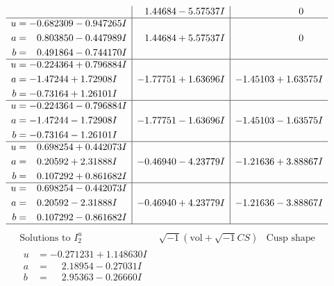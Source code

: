 \documentclass[1p]{elsarticle_modified}
\theoremstyle{definition}
\newcommand{\I}{\sqrt{-1}}
\begin{document}
$$\begin{array}{c|c|c}
 & \phantom{-}1.44684 - 5.57537 I & \phantom{-0.000000 } 0 \\ \hline\begin{aligned}
u &= -0.682309 - 0.947265 I \\
a &= \phantom{-}0.803850 - 0.447989 I \\
b &= \phantom{-}0.491864 - 0.744170 I\end{aligned}
 & \phantom{-}1.44684 + 5.57537 I & \phantom{-0.000000 } 0 \\ \hline\begin{aligned}
u &= -0.224364 + 0.796884 I \\
a &= -1.47244 + 1.72908 I \\
b &= -0.73164 + 1.26101 I\end{aligned}
 & -1.77751 + 1.63696 I & -1.45103 + 1.63575 I \\ \hline\begin{aligned}
u &= -0.224364 - 0.796884 I \\
a &= -1.47244 - 1.72908 I \\
b &= -0.73164 - 1.26101 I\end{aligned}
 & -1.77751 - 1.63696 I & -1.45103 - 1.63575 I \\ \hline\begin{aligned}
u &= \phantom{-}0.698254 + 0.442073 I \\
a &= \phantom{-}0.20592 + 2.31888 I \\
b &= \phantom{-}0.107292 + 0.861682 I\end{aligned}
 & -0.46940 - 4.23779 I & -1.21636 + 3.88867 I \\ \hline\begin{aligned}
u &= \phantom{-}0.698254 - 0.442073 I \\
a &= \phantom{-}0.20592 - 2.31888 I \\
b &= \phantom{-}0.107292 - 0.861682 I\end{aligned}
 & -0.46940 + 4.23779 I & -1.21636 - 3.88867 I\\
 \hline 
 \end{array}$$\newpage$$\begin{array}{c|c|c}  
\text{Solutions to }I^u_{2}& \I (\text{vol} + \sqrt{-1}CS) & \text{Cusp shape}\\
 \hline 
\begin{aligned}
u &= -0.271231 + 1.148630 I \\
a &= \phantom{-}2.18954 - 0.27031 I \\
b &= \phantom{-}2.95363 - 0.26660 I\end{aligned}

\end{array}$$
\end{document}
